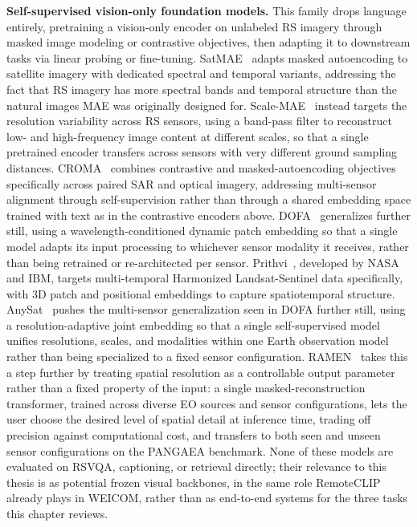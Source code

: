 \textbf{Self-supervised vision-only foundation models.} This family drops language entirely, pretraining a vision-only encoder on unlabeled RS imagery through masked image modeling or contrastive objectives, then adapting it to downstream tasks via linear probing or fine-tuning. SatMAE~\cite{cong2022satmae} adapts masked autoencoding to satellite imagery with dedicated spectral and temporal variants, addressing the fact that RS imagery has more spectral bands and temporal structure than the natural images MAE was originally designed for. Scale-MAE~\cite{reed2023scalemae} instead targets the resolution variability across RS sensors, using a band-pass filter to reconstruct low- and high-frequency image content at different scales, so that a single pretrained encoder transfers across sensors with very different ground sampling distances. CROMA~\cite{fuller2023croma} combines contrastive and masked-autoencoding objectives specifically across paired SAR and optical imagery, addressing multi-sensor alignment through self-supervision rather than through a shared embedding space trained with text as in the contrastive encoders above. DOFA~\cite{xiong2024dofa} generalizes further still, using a wavelength-conditioned dynamic patch embedding so that a single model adapts its input processing to whichever sensor modality it receives, rather than being retrained or re-architected per sensor. Prithvi~\cite{jakubik2023prithvi}, developed by NASA and IBM, targets multi-temporal Harmonized Landsat-Sentinel data specifically, with 3D patch and positional embeddings to capture spatiotemporal structure. AnySat~\cite{astruc2024anysat} pushes the multi-sensor generalization seen in DOFA further still, using a resolution-adaptive joint embedding so that a single self-supervised model unifies resolutions, scales, and modalities within one Earth observation model rather than being specialized to a fixed sensor configuration.  RAMEN~\cite{ramen} takes this a step further by treating spatial resolution as a controllable output parameter rather than a fixed property of the input: a single masked-reconstruction transformer, trained across diverse EO sources and sensor configurations, lets the user choose the desired level of spatial detail at inference time, trading off precision against computational cost, and transfers to both seen and unseen sensor configurations on the PANGAEA benchmark. None of these models are evaluated on RSVQA, captioning, or retrieval directly; their relevance to this thesis is as potential frozen visual backbones, in the same role RemoteCLIP already plays in WEICOM, rather than as end-to-end systems for the three tasks this chapter reviews.

